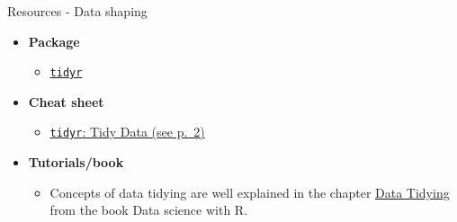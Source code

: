 \documentclass[8pt,ignorenonframetext,]{beamer}
\providecommand{\tightlist}{%
  \setlength{\itemsep}{0pt}\setlength{\parskip}{0pt}}
\begin{document}
\begin{frame}[fragile]{Resources - Data shaping}

\begin{itemize}
\tightlist
\item
  \textbf{Package}

  \begin{itemize}
  \tightlist
  \item
    \href{https://cran.r-project.org/web/packages/tidyr/index.html}{\texttt{tidyr}}
  \end{itemize}
\item
  \textbf{Cheat sheet}

  \begin{itemize}
  \tightlist
  \item
    \href{https://github.com/rstudio/cheatsheets/raw/master/data-import.pdf}{\texttt{tidyr}:
    Tidy Data (see p.~2)}
  \end{itemize}
\item
  \textbf{Tutorials/book}

  \begin{itemize}
  \tightlist
  \item
    Concepts of data tidying are well explained in the chapter
    \href{http://garrettgman.github.io/tidying/}{Data Tidying} from the
    book Data science with R.
  \end{itemize}
\end{itemize}

\end{frame}
\end{document}

